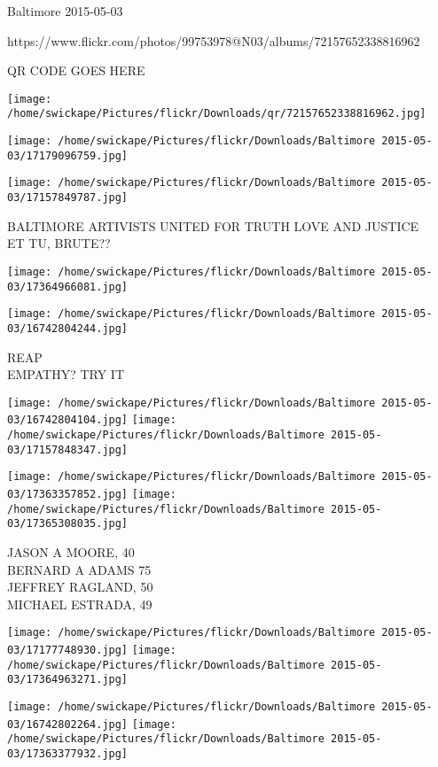 \documentclass[10pt,letterpaper]{article}
\begin{document}
Baltimore 2015-05-03

https://www.flickr.com/photos/99753978@N03/albums/72157652338816962

QR CODE GOES HERE

\texttt{[image: /home/swickape/Pictures/flickr/Downloads/qr/72157652338816962.jpg]}
\pagebreak

\texttt{[image: /home/swickape/Pictures/flickr/Downloads/Baltimore 2015-05-03/17179096759.jpg]}

\vspace{0.25in}
\texttt{[image: /home/swickape/Pictures/flickr/Downloads/Baltimore 2015-05-03/17157849787.jpg]}

BALTIMORE ARTIVISTS UNITED FOR TRUTH LOVE AND JUSTICE\\
ET TU, BRUTE??\\
\pagebreak

\texttt{[image: /home/swickape/Pictures/flickr/Downloads/Baltimore 2015-05-03/17364966081.jpg]}

\vspace{0.25in}
\texttt{[image: /home/swickape/Pictures/flickr/Downloads/Baltimore 2015-05-03/16742804244.jpg]}

REAP\\
EMPATHY?  TRY IT\\
\pagebreak

\texttt{[image: /home/swickape/Pictures/flickr/Downloads/Baltimore 2015-05-03/16742804104.jpg]}
\texttt{[image: /home/swickape/Pictures/flickr/Downloads/Baltimore 2015-05-03/17157848347.jpg]}

\texttt{[image: /home/swickape/Pictures/flickr/Downloads/Baltimore 2015-05-03/17363357852.jpg]}
\texttt{[image: /home/swickape/Pictures/flickr/Downloads/Baltimore 2015-05-03/17365308035.jpg]}

JASON A MOORE, 40\\
BERNARD A ADAMS 75\\
JEFFREY RAGLAND, 50\\
MICHAEL ESTRADA, 49\\
\pagebreak

\texttt{[image: /home/swickape/Pictures/flickr/Downloads/Baltimore 2015-05-03/17177748930.jpg]}
\texttt{[image: /home/swickape/Pictures/flickr/Downloads/Baltimore 2015-05-03/17364963271.jpg]}

\texttt{[image: /home/swickape/Pictures/flickr/Downloads/Baltimore 2015-05-03/16742802264.jpg]}
\texttt{[image: /home/swickape/Pictures/flickr/Downloads/Baltimore 2015-05-03/17363377932.jpg]}
\end{document}
